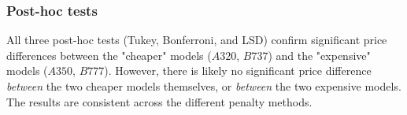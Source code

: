 \subsubsection*{Post-hoc tests}
All three post-hoc tests (Tukey, Bonferroni, and LSD) confirm significant price differences between the "cheaper" models ($A320$, $B737$) and the "expensive" models ($A350$, $B777$). However, there is likely no significant price difference \textit{between} the two cheaper models themselves, or \textit{between} the two expensive models. The results are consistent across the different penalty methods.